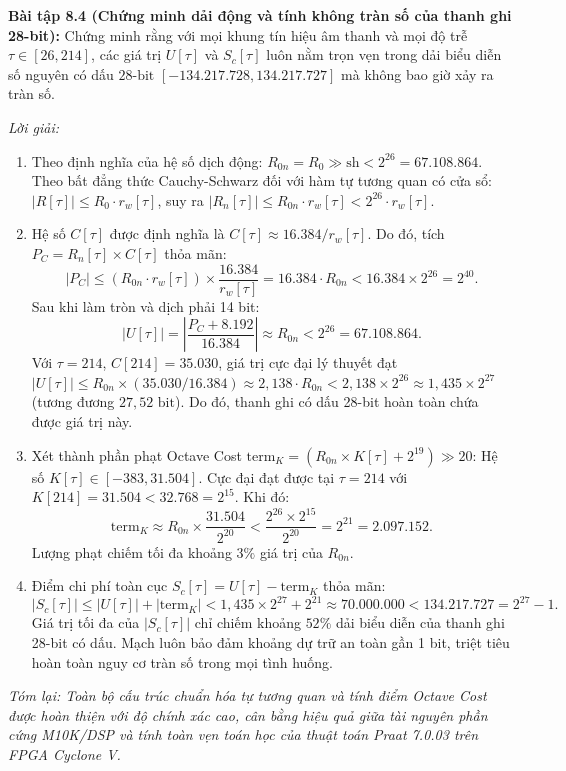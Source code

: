 \textbf{Bài tập 8.4 (Chứng minh dải động và tính không tràn số của thanh ghi 28-bit):}
Chứng minh rằng với mọi khung tín hiệu âm thanh và mọi độ trễ $\tau \in [26, 214]$, các giá trị $U[\tau]$ và $S_c[\tau]$ luôn nằm trọn vẹn trong dải biểu diễn số nguyên có dấu $28\text{-bit}$ $[-134.217.728, 134.217.727]$ mà không bao giờ xảy ra tràn số.

\textit{Lời giải:}
\begin{enumerate}[leftmargin=1.5em]
    \item Theo định nghĩa của hệ số dịch động: $R_{0n} = R_0 \gg \text{sh} < 2^{26} = 67.108.864$. Theo bất đẳng thức Cauchy-Schwarz đối với hàm tự tương quan có cửa sổ: $|R[\tau]| \le R_0 \cdot r_w[\tau]$, suy ra $|R_n[\tau]| \le R_{0n} \cdot r_w[\tau] < 2^{26} \cdot r_w[\tau]$.
    \item Hệ số $C[\tau]$ được định nghĩa là $C[\tau] \approx 16.384 / r_w[\tau]$. Do đó, tích $P_C = R_n[\tau] \times C[\tau]$ thỏa mãn:
    \begin{equation}
        |P_C| \le (R_{0n} \cdot r_w[\tau]) \times \frac{16.384}{r_w[\tau]} = 16.384 \cdot R_{0n} < 16.384 \times 2^{26} = 2^{40}.
    \end{equation}
    Sau khi làm tròn và dịch phải 14 bit:
    \begin{equation}
        |U[\tau]| = \left|\frac{P_C + 8.192}{16.384}\right| \approx R_{0n} < 2^{26} = 67.108.864.
    \end{equation}
    Với $\tau = 214$, $C[214] = 35.030$, giá trị cực đại lý thuyết đạt $|U[\tau]| \le R_{0n} \times (35.030 / 16.384) \approx 2{,}138 \cdot R_{0n} < 2{,}138 \times 2^{26} \approx 1{,}435 \times 2^{27}$ (tương đương $27{,}52\text{ bit}$). Do đó, thanh ghi có dấu 28-bit hoàn toàn chứa được giá trị này.
    \item Xét thành phần phạt Octave Cost $\text{term}_K = (R_{0n} \times K[\tau] + 2^{19}) \gg 20$:
    Hệ số $K[\tau] \in [-383, 31.504]$. Cực đại đạt được tại $\tau = 214$ với $K[214] = 31.504 < 32.768 = 2^{15}$. Khi đó:
    \begin{equation}
        \text{term}_K \approx R_{0n} \times \frac{31.504}{2^{20}} < \frac{2^{26} \times 2^{15}}{2^{20}} = 2^{21} = 2.097.152.
    \end{equation}
    Lượng phạt chiếm tối đa khoảng $3\%$ giá trị của $R_{0n}$.
    \item Điểm chi phí toàn cục $S_c[\tau] = U[\tau] - \text{term}_K$ thỏa mãn:
    \begin{equation}
        |S_c[\tau]| \le |U[\tau]| + |\text{term}_K| < 1{,}435 \times 2^{27} + 2^{21} \approx 70.000.000 < 134.217.727 = 2^{27}-1.
    \end{equation}
    Giá trị tối đa của $|S_c[\tau]|$ chỉ chiếm khoảng $52\%$ dải biểu diễn của thanh ghi 28-bit có dấu. Mạch luôn bảo đảm khoảng dự trữ an toàn gần 1 bit, triệt tiêu hoàn toàn nguy cơ tràn số trong mọi tình huống.
\end{enumerate}

\textit{Tóm lại: Toàn bộ cấu trúc chuẩn hóa tự tương quan và tính điểm Octave Cost được hoàn thiện với độ chính xác cao, cân bằng hiệu quả giữa tài nguyên phần cứng M10K/DSP và tính toàn vẹn toán học của thuật toán Praat 7.0.03 trên FPGA Cyclone V.}
